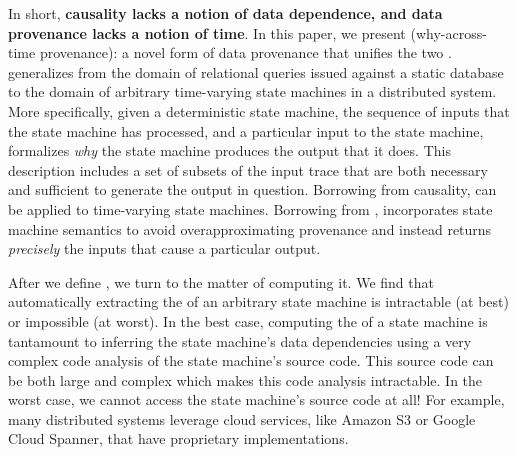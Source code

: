 In short, \textbf{causality lacks a notion of data dependence, and data
provenance lacks a notion of time}. In this paper, we present
 (why-across-time provenance): a novel form of data
provenance that unifies the two . \Watprovenance{} generalizes \whyprovenance{}
from the domain of relational queries issued against a static database to the
domain of arbitrary time-varying state machines in a distributed system. More
specifically, given a deterministic state machine, the sequence of inputs that
the state machine has processed, and a particular input to the state machine,
\watprovenance{} formalizes \emph{why} the state machine produces the output
that it does. This description includes a set of subsets  of the input trace
that are both necessary and sufficient to generate the output in question.
Borrowing from causality, \watprovenance{} can be applied to time-varying state
machines. Borrowing from \whyprovenance{}, \watprovenance{} incorporates state
machine semantics to avoid overapproximating provenance and instead returns
\emph{precisely} the inputs that cause a particular output.

After we define \watprovenance{}, we turn to the matter of computing it. We
find  that automatically extracting the \watprovenance{} of an arbitrary state
machine is intractable (at best) or impossible (at worst). 
In the best case,
computing the \watprovenance{} of a state machine is tantamount to inferring
the state machine's data dependencies using a very complex code analysis of the
state machine's source code. This source code can be both large and complex
which makes this code analysis intractable. In the worst case, we cannot access
the state machine's source code at all! For example, many distributed systems
leverage cloud services, like Amazon S3 or Google Cloud Spanner, that have
proprietary implementations.

